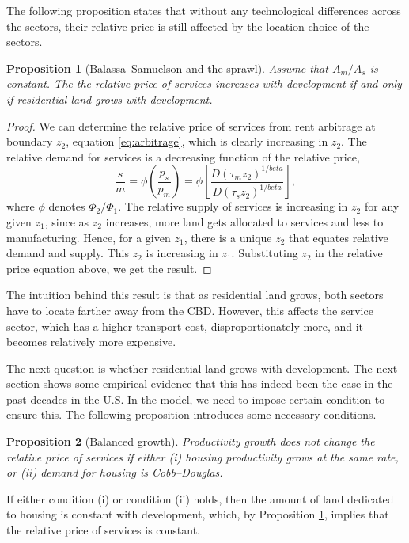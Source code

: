 \documentclass[12pt]{article}
\newtheorem{proposition}{Proposition}
\begin{document}
The following proposition states that without any technological differences across the sectors, their relative price is still affected by the location choice of the sectors.
\begin{proposition}[Balassa--Samuelson and the sprawl]\label{prop:sprawl}
 Assume that $A_m/A_s$ is constant. The the relative price of services increases with development if and only if residential land grows with development.
\end{proposition}
\begin{proof}
We can determine the relative price of services from rent arbitrage at boundary $z_2$, equation \eqref{eq:arbitrage}, which is clearly increasing in $z_2$. The relative demand for services is a decreasing function of the relative price,
    \[
    \frac{s}{m} = \phi\left(\frac{p_s}{p_m}\right) = \phi\left[\frac{D(\tau_m z_2)^{1/beta}}{D(\tau_s z_2)^{1/beta}}\right],
    \]
where $\phi$ denotes $\Phi_2/\Phi_1$. The relative supply of services is increasing in $z_2$ for any given $z_1$, since as $z_2$ increases, more land gets allocated to services and less to manufacturing. Hence, for a given $z_1$, there is a unique $z_2$ that equates relative demand and supply. This $z_2$ is increasing in $z_1$. Substituting $z_2$ in the relative price equation above, we get the result.
\end{proof}

The intuition behind this result is that as residential land grows, both sectors have to locate farther away from the CBD. However, this affects the service sector, which has a higher transport cost, disproportionately more, and it becomes relatively more expensive.

The next question is whether residential land grows with development. The next section shows some empirical evidence that this has indeed been the case in the past decades in the U.S. In the model, we need to impose certain condition to ensure this. The following proposition introduces some necessary conditions.

\begin{proposition}[Balanced growth]
Productivity growth does not change the relative price of services if either
      (i) housing productivity grows at the same rate,
      or (ii) demand for housing is Cobb--Douglas.
\end{proposition}
If either condition (i) or condition (ii) holds, then the amount of land dedicated to housing is constant with development, which, by Proposition \ref{prop:sprawl}, implies that the relative price of services is constant.
\end{document}
